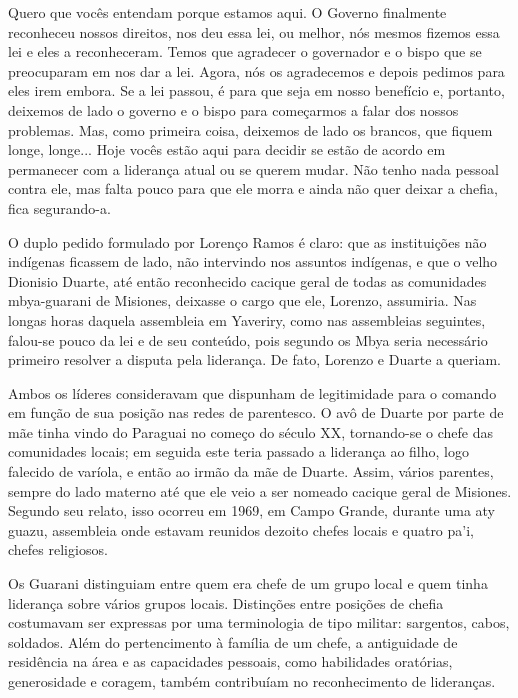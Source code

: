 \documentclass{article}
\begin{document}
Quero que voc\^es entendam porque estamos aqui. O Governo finalmente
reconheceu nossos direitos, nos deu essa lei, ou melhor, n\'os mesmos
fizemos essa lei e eles a reconheceram. Temos que agradecer o
governador e o bispo que se preocuparam em nos dar a lei. Agora, n\'os
os agradecemos e depois pedimos para eles irem embora. Se a lei passou,
\'e para que seja em nosso benef\'icio e, portanto, deixemos de lado o
governo e o bispo para come\c{c}armos a falar dos nossos problemas.
Mas, como primeira coisa, deixemos de lado os brancos, que fiquem
longe, longe... Hoje voc\^es est\~ao aqui para decidir se est\~ao de
acordo em permanecer com a lideran\c{c}a atual ou se querem mudar.
N\~ao tenho nada pessoal contra ele, mas falta pouco para que ele morra
e ainda n\~ao quer deixar a chefia, fica segurando-a.

O duplo pedido formulado por Loren\c{c}o Ramos \'e claro: que as
institui\c{c}\~oes n\~ao ind\'igenas ficassem de lado, n\~ao intervindo
nos assuntos ind\'igenas, e que o velho Dionisio Duarte, at\'e ent\~ao
reconhecido cacique geral de todas as comunidades mbya-guarani de
Misiones, deixasse o cargo que ele, Lorenzo, assumiria. Nas longas
horas daquela assembleia em Yaveriry, como nas assembleias seguintes,
falou-se pouco da lei e de seu conte\'udo, pois segundo os Mbya seria
necess\'ario primeiro resolver a disputa pela lideran\c{c}a. De fato,
Lorenzo e Duarte a queriam.

Ambos os l\'ideres consideravam que dispunham de legitimidade para o
comando em fun\c{c}\~ao de sua posi\c{c}\~ao nas redes de parentesco. O
av\^o de Duarte por parte de m\~ae tinha vindo do Paraguai no
come\c{c}o do s\'eculo XX, tornando-se o chefe das comunidades locais;
em seguida este teria passado a lideran\c{c}a ao filho, logo falecido
de var\'iola, e ent\~ao ao irm\~ao da m\~ae de Duarte. Assim, v\'arios
parentes, sempre do lado materno at\'e que ele veio a ser nomeado
cacique geral de Misiones. Segundo seu relato, isso ocorreu em 1969, em
Campo Grande, durante uma aty guazu, assembleia onde estavam reunidos
dezoito chefes locais e quatro pa{\textquoteright}i, chefes religiosos.


Os Guarani distinguiam entre quem era chefe de um grupo local e quem
tinha lideran\c{c}a sobre v\'arios grupos locais. Distin\c{c}\~oes
entre posi\c{c}\~oes de chefia costumavam ser expressas por uma
terminologia de tipo militar: sargentos, cabos, soldados. Al\'em do
pertencimento \`a fam\'ilia de um chefe, a antiguidade de resid\^encia
na \'area e as capacidades pessoais, como habilidades orat\'orias,
generosidade e coragem, tamb\'em contribu\'iam no reconhecimento de
lideran\c{c}as. 
\end{document}
